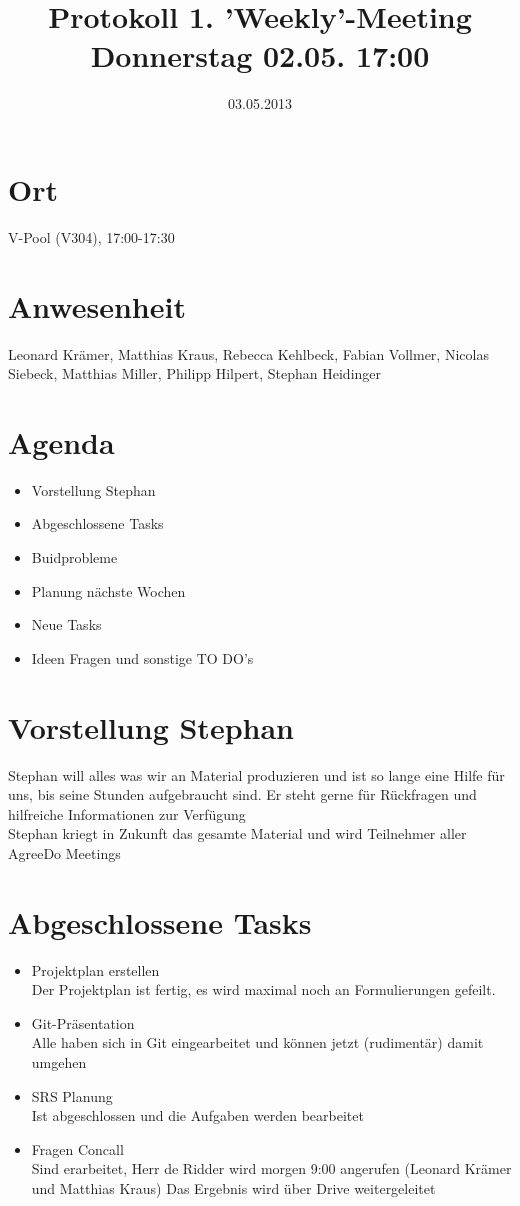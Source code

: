 \documentclass{scrartcl}
\date{03.05.2013}
\title{Protokoll 1. 'Weekly'-Meeting Donnerstag 02.05. 17:00}
\begin{document}
\maketitle
\section{Ort}
V-Pool (V304), 17:00-17:30
\section{Anwesenheit}
Leonard Krämer, Matthias Kraus, Rebecca Kehlbeck, Fabian Vollmer, Nicolas Siebeck, Matthias Miller, Philipp Hilpert, Stephan Heidinger
\section{Agenda}
\begin{itemize}
\item Vorstellung Stephan
\item Abgeschlossene Tasks
\item Buidprobleme
\item Planung nächste Wochen
\item Neue Tasks
\item Ideen Fragen und sonstige TO DO's
\end{itemize}
\section{Vorstellung Stephan}
Stephan will alles was wir an Material produzieren und ist so lange eine Hilfe für uns, bis seine Stunden aufgebraucht sind.
Er steht gerne für Rückfragen und hilfreiche Informationen zur Verfügung \\
Stephan kriegt in Zukunft das gesamte Material und wird Teilnehmer aller AgreeDo Meetings
\section{Abgeschlossene Tasks}
\begin{itemize}
\item Projektplan erstellen \\ Der Projektplan ist fertig, es wird maximal noch an Formulierungen gefeilt.
\item Git-Präsentation \\ Alle haben sich in Git eingearbeitet und können jetzt (rudimentär) damit umgehen
\item SRS Planung \\ Ist abgeschlossen und die Aufgaben werden bearbeitet
\item Fragen Concall \\ Sind erarbeitet, Herr de Ridder wird morgen 9:00 angerufen (Leonard Krämer und Matthias Kraus) Das Ergebnis wird über Drive weitergeleitet
\end{itemize}
\end{document}
